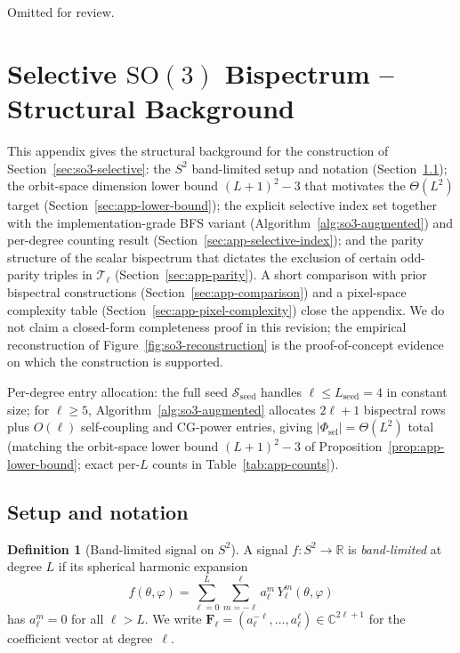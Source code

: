 \documentclass{article}
\theoremstyle{definition}
\newtheorem{definition}[theorem]{Definition}
\theoremstyle{remark}
\newcommand{\R}{\mathbb{R}}
\newcommand{\C}{\mathbb{C}}
\newcommand{\SO}{\mathrm{SO}}
\newcommand{\SH}{Y}
\theoremstyle{definition}
\begin{document}
\begin{ack}
Omitted for review.
\end{ack}




\appendix

\section{Selective $\SO(3)$ Bispectrum -- Structural Background}
\label{app:so3-proof}

This appendix gives the structural background for the construction
of Section~\ref{sec:so3-selective}: the $S^2$ band-limited setup and
notation (Section~\ref{sec:app-setup}); the orbit-space dimension
lower bound $(L{+}1)^2-3$ that motivates the $\Theta(L^2)$ target
(Section~\ref{sec:app-lower-bound}); the explicit selective index set
together with the implementation-grade BFS variant
(Algorithm~\ref{alg:so3-augmented}) and per-degree counting result
(Section~\ref{sec:app-selective-index}); and the parity structure of
the scalar bispectrum that dictates the exclusion of certain
odd-parity triples in $\mathcal{T}_\ell$
(Section~\ref{sec:app-parity}). A short comparison with prior bispectral
constructions (Section~\ref{sec:app-comparison}) and a pixel-space
complexity table (Section~\ref{sec:app-pixel-complexity}) close the
appendix. We do not claim a closed-form completeness proof in this
revision; the empirical reconstruction of
Figure~\ref{fig:so3-reconstruction} is the proof-of-concept evidence
on which the construction is supported.

Per-degree entry allocation: the full seed
$\mathcal{S}_{\mathrm{seed}}$ handles $\ell\le L_{\mathrm{seed}}=4$
in constant size; for $\ell\ge 5$, Algorithm~\ref{alg:so3-augmented}
allocates $2\ell{+}1$ bispectral rows plus $O(\ell)$
self-coupling and CG-power entries, giving
$|\Phi_{\mathrm{sel}}|=\Theta(L^2)$ total (matching the orbit-space
lower bound $(L{+}1)^2-3$ of
Proposition~\ref{prop:app-lower-bound}; exact per-$L$ counts in
Table~\ref{tab:app-counts}).

\subsection{Setup and notation}
\label{sec:app-setup}

\begin{definition}[Band-limited signal on $S^2$]
A signal $f : S^2 \to \R$ is \emph{band-limited} at degree $L$ if its
spherical harmonic expansion
\begin{equation}\label{eq:app-sh-expansion}
  f(\theta, \varphi)
  = \sum_{\ell=0}^{L} \sum_{m=-\ell}^{\ell}
    a_\ell^m \, \SH_\ell^m(\theta, \varphi)
\end{equation}
has $a_\ell^m = 0$ for all $\ell > L$. We write
$\mathbf{F}_\ell = (a_\ell^{-\ell}, \dotsc, a_\ell^{\ell})
  \in \C^{2\ell+1}$
for the coefficient vector at degree~$\ell$.
\end{definition}
\end{document}
